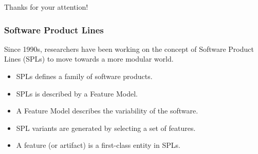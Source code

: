 \documentclass[9pt,xcolor=table,svgnames]{beamer}
\begin{document}
\begin{frame}
    \begin{center}
        \huge Thanks for your attention!
    \end{center}
\end{frame}


\begingroup

\begin{frame}[noframenumbering]
    \frametitle{Software Product Lines}

    Since 1990s, researchers have been working on the concept of \alert{Software Product Lines} (SPLs) to move towards a more \alert{modular} world.

    \bigskip
    \pause

    \begin{itemize}
        \item SPLs defines a \alert{family} of software products.
        \item SPLs is described by a \alert{Feature Model}.
        \item A Feature Model describes the \alert{variability} of the software.
        \item SPL \alert{variants} are generated by selecting a set of features.
        \item A \alert{feature} (or \alert{artifact}) is a first-class entity in SPLs.
    \end{itemize}
\end{frame}
\end{document}
